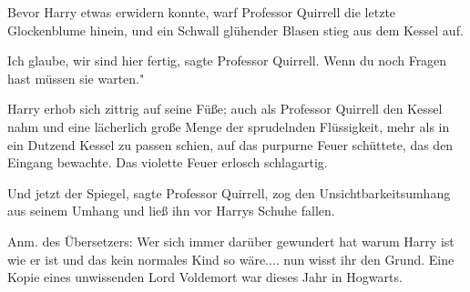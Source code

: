 Bevor Harry etwas erwidern konnte, warf Professor Quirrell die letzte
Glockenblume hinein, und ein Schwall glühender Blasen stieg aus dem Kessel auf.

\glqq{}Ich glaube, wir sind hier fertig\grqq{}, sagte Professor Quirrell. \glqq
Wenn du noch Fragen hast müssen sie warten."

Harry erhob sich zittrig auf seine Füße; auch als Professor Quirrell den Kessel
nahm und eine lächerlich große Menge der sprudelnden Flüssigkeit, mehr als in
ein Dutzend Kessel zu passen schien, auf das purpurne Feuer schüttete, das den
Eingang bewachte. Das violette Feuer erlosch schlagartig.

\glqq{}Und jetzt der Spiegel\grqq{}, sagte Professor Quirrell, zog den
Unsichtbarkeitsumhang aus seinem Umhang und ließ ihn vor Harrys Schuhe fallen.


Anm. des Übersetzers: Wer sich immer darüber gewundert hat warum Harry ist wie
er ist und das kein normales Kind so wäre.... nun wisst ihr den Grund. Eine
Kopie eines unwissenden Lord Voldemort war dieses Jahr in Hogwarts.

